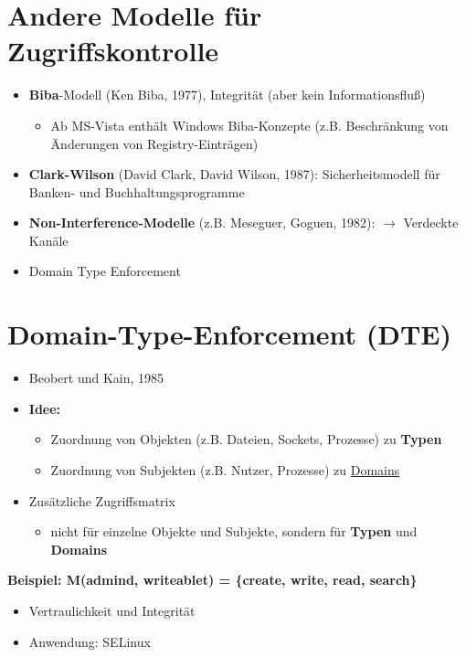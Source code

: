 \documentclass[openany]{book}
\begin{document}
\section{Andere Modelle für Zugriffskontrolle}

\begin{itemize}
\item \textbf{Biba}-Modell (Ken Biba, 1977), Integrität (aber kein Informationsfluß)
\begin{itemize}
\item Ab MS-Vista enthält Windows Biba-Konzepte (z.B. Beschränkung von Änderungen von Registry-Einträgen)
\end{itemize}
\item \textbf{Clark-Wilson} (David Clark, David Wilson, 1987): Sicherheitsmodell für Banken- und Buchhaltungsprogramme
\item \textbf{Non-Interference-Modelle} (z.B. Meseguer, Goguen, 1982): $\rightarrow$ Verdeckte Kanäle
\item Domain Type Enforcement
\end{itemize}

\section{Domain-Type-Enforcement (DTE)}

\begin{itemize}
    \item Beobert und Kain, 1985
    \item \textbf{Idee:}
    \begin{itemize}
        \item Zuordnung von Objekten (z.B. Dateien, Sockets, Prozesse) zu \textbf{Typen}
        \item Zuordnung von Subjekten (z.B. Nutzer, Prozesse) zu \underline{Domains}
    \end{itemize}
    \item Zusätzliche Zugriffsmatrix
    \begin{itemize}
        \item nicht für einzelne Objekte und Subjekte, sondern für \textbf{Typen} und \textbf{Domains}
    \end{itemize}
\end{itemize}

\textbf{Beispiel: M(admin\textunderscore d, writeable\textunderscore t) = \{create, write, read, search\}} 

\begin{itemize}
    \item Vertraulichkeit und Integrität
    \item Anwendung: SELinux
\end{itemize}
\end{document}
